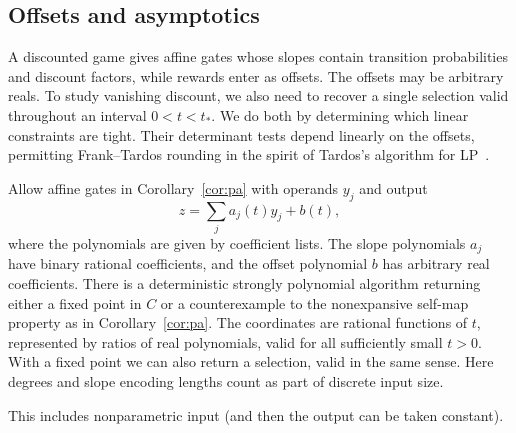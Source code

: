 \subsection{Offsets and asymptotics}

A discounted game gives affine gates whose slopes contain
transition probabilities and discount factors, while rewards enter
as offsets. The offsets may be arbitrary reals. To study vanishing
discount, we also need to recover a single selection valid throughout
an interval \(0<t<t_*\). We do both by determining which linear
constraints are tight. Their determinant tests depend linearly on
the offsets, permitting Frank--Tardos rounding in the spirit of
Tardos's algorithm for LP~\cite{Tardos}.

\begin{proposition}\label{prop:asym}
Allow affine gates in Corollary~\ref{cor:pa}
with operands \(y_j\) and output
\[
 z=\sum_j a_j(t)y_j+b(t),
\]
where the polynomials are given by coefficient lists. The slope
polynomials \(a_j\) have binary rational coefficients, and the offset
polynomial \(b\) has arbitrary real coefficients.
There is a deterministic strongly polynomial algorithm returning
either a fixed point in \(C\) or a counterexample to the nonexpansive
self-map property as in Corollary~\ref{cor:pa}. The coordinates
are rational functions of \(t\), represented by ratios of real
polynomials, valid for all sufficiently small \(t>0\).
With a fixed point we can also return a selection, valid in the
same sense.
Here degrees and slope encoding lengths count as part
of discrete input size.
\end{proposition}

This includes nonparametric input (and then the output
can be taken constant).

